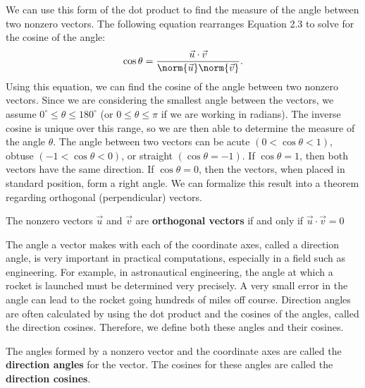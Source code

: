 \documentclass{report}
\begin{document}
    \pagebreak \bigbreak \noindent 
    We can use this form of the dot product to find the measure of the angle between two nonzero vectors. The following equation rearranges Equation 2.3 to solve for the cosine of the angle:
    \begin{align*}
        \cos{\theta } = \frac{\vec{u} \cdot \vec{v}}{\norm{\vec{u}}\norm{\vec{v}}}
    .\end{align*}
    \bigbreak \noindent 
    Using this equation, we can find the cosine of the angle between two nonzero vectors. Since we are considering the smallest angle between the vectors, we assume $0^\circ \leq \theta \leq 180^\circ$ (or $0 \leq \theta \leq \pi$ if we are working in radians). The inverse cosine is unique over this range, so we are then able to determine the measure of the angle $\theta$.
    \bigbreak \noindent 
    The angle between two vectors can be acute $(0 < \cos\theta < 1)$, obtuse $(-1 < \cos\theta < 0)$, or straight $(\cos\theta = -1)$. If $\cos\theta = 1$, then both vectors have the same direction. If $\cos\theta = 0$, then the vectors, when placed in standard position, form a right angle. We can formalize this result into a theorem regarding orthogonal (perpendicular) vectors.
    \bigbreak \noindent 
    \bigbreak \noindent 
    \begin{thrmm}
        The nonzero vectors  $\vec{u}$ and  $\vec{v}$ are \textbf{orthogonal vectors} if and only if  $\vec{u} \cdot \vec{v} = 0 $
    \end{thrmm}
    \bigbreak \noindent 
    The angle a vector makes with each of the coordinate axes, called a direction angle, is very important in practical computations, especially in a field such as engineering. For example, in astronautical engineering, the angle at which a rocket is launched must be determined very precisely. A very small error in the angle can lead to the rocket going hundreds of miles off course. Direction angles are often calculated by using the dot product and the cosines of the angles, called the direction cosines. Therefore, we define both these angles and their cosines.
    \pagebreak 
    \begin{dfn}
        The angles formed by a nonzero vector and the coordinate axes are called the \textbf{direction angles} for the vector. The cosines for these angles are called the \textbf{direction cosines}.
    \end{dfn}
    \bigbreak \noindent 

    \bigbreak \noindent 
\end{document}
